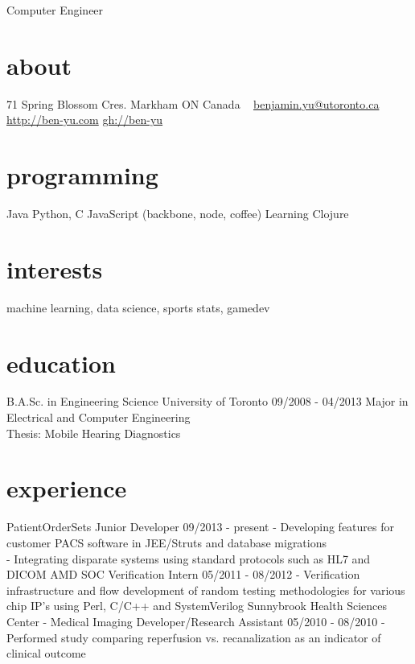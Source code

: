 \documentclass[]{friggeri-cv}
\begin{document}
       {Computer Engineer}


\begin{aside}
  \section{about}
    71 Spring Blossom Cres.
    Markham ON
    Canada
    ~
    \href{mailto:benjamin.yu@utoronto.ca}{benjamin.yu@utoronto.ca}
    \href{http://ben-yu.com}{http://ben-yu.com}
    \href{https://github.com/ben-yu}{gh://ben-yu}
  \section{programming}
    Java
    Python, C
    JavaScript
    (backbone, node, coffee)
    Learning Clojure
\end{aside}

\section{interests}

machine learning, data science, sports stats, gamedev

\section{education}

\begin{entrylist}
  \entry
    {B.A.Sc. in Engineering Science}
    {University of Toronto}
    {09/2008 - 04/2013}
    {Major in Electrical and Computer Engineering \\
     Thesis: Mobile Hearing Diagnostics}

\end{entrylist}

\section{experience}

\begin{entrylist}
  \entry
    {PatientOrderSets}
    {Junior Developer}
    {09/2013 - present}
    {- Developing features for customer PACS software in JEE/Struts and database migrations\\
     - Integrating disparate systems using standard protocols such as HL7 and DICOM}
  \entry
    {AMD}
    {SOC Verification Intern}
    {05/2011 - 08/2012}
    {- Verification infrastructure and  flow development of random testing methodologies for various chip   IP’s using Perl, C/C++ and SystemVerilog}
  \entry
    {Sunnybrook Health Sciences Center - Medical Imaging}
    {Developer/Research Assistant}
    {05/2010 - 08/2010}
    {- Performed study comparing reperfusion vs. recanalization as an indicator of clinical outcome}
\end{entrylist}
\end{document}
